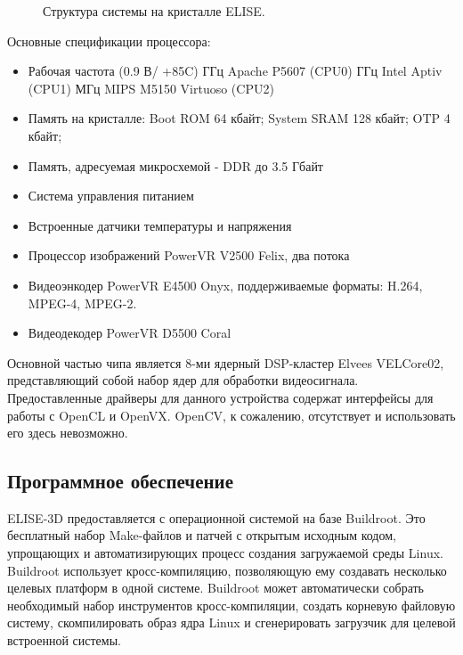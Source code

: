 \documentclass[14pt,a4paper]{scrartcl}
\begin{document}
			\begin{figure}[h]
				\caption{Структура системы на кристалле ELISE.}
				\label{fig:Elise_Scheme}
			\end{figure}
			
			Основные спецификации процессора:
			
			\begin{itemize}
				\item Рабочая частота (0.9 В/ +85\textdegree{}C)
					 ГГц Apache P5607 (CPU0)
					 ГГц Intel Aptiv (CPU1)
					 МГц MIPS M5150 Virtuoso (CPU2)
				\item Память на кристалле: Boot ROM 64 кбайт; System SRAM 128 кбайт; OTP 4 кбайт;
				\item Память, адресуемая микросхемой - DDR до 3.5 Гбайт
				\item Система управления питанием
				\item Встроенные датчики температуры и напряжения
				\item Процессор изображений PowerVR V2500 Felix, два потока
				\item Видеоэнкодер PowerVR E4500 Onyx, поддерживаемые форматы: H.264, MPEG-4, MPEG-2.
				\item Видеодекодер PowerVR D5500 Coral
			\end{itemize}
		
			Основной частью чипа является 8-ми ядерный DSP-кластер Elvees VELCore02, представляющий собой набор ядер для обработки видеосигнала. Предоставленные драйверы для данного устройства содержат интерфейсы для работы с OpenCL и OpenVX. OpenCV, к сожалению, отсутствует и использовать его здесь невозможно.
		
	\subsection{Программное обеспечение}
	
		ELISE-3D предоставляется с операционной системой на базе Buildroot. Это бесплатный набор Make-файлов и патчей с открытым исходным кодом, упрощающих и автоматизирующих процесс создания загружаемой среды Linux. Buildroot использует кросс-компиляцию, позволяющую ему создавать несколько целевых платформ в одной системе. Buildroot может автоматически собрать необходимый набор инструментов кросс-компиляции, создать корневую файловую систему, скомпилировать образ ядра Linux и сгенерировать загрузчик для целевой встроенной системы.
		
\end{document}
